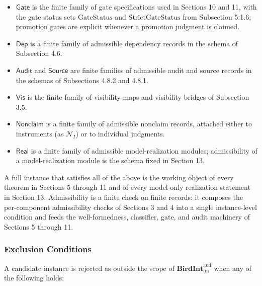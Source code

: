\documentclass[11pt]{article}
\theoremstyle{definition}
\begin{document}
\begin{itemize}
  Threshold records are finite and typed in the threshold schema of Subsection 5.2.
\item
  \(\mathsf{Gate}\) is the finite family of gate specifications used in Sections 10 and 11, with the gate status sets \(\mathrm{GateStatus}\) and \(\mathrm{StrictGateStatus}\) from Subsection 5.1.6; promotion gates are explicit whenever a promotion judgment is claimed.
\item
  \(\mathsf{Dep}\) is a finite family of admissible dependency records in the schema of Subsection 4.6.
\item
  \(\mathsf{Audit}\) and \(\mathsf{Source}\) are finite families of admissible audit and source records in the schemas of Subsections 4.8.2 and 4.8.1.
\item
  \(\mathsf{Vis}\) is the finite family of visibility maps and visibility bridges of Subsection 3.5.
\item
  \(\mathsf{Nonclaim}\) is a finite family of admissible nonclaim records, attached either to instruments (as \(\mathcal N_I\)) or to individual judgments.
\item
  \(\mathsf{Real}\) is a finite family of admissible model-realization modules; admissibility of a model-realization module is the schema fixed in Section 13.
\end{itemize}

A full instance that satisfies all of the above is the working object of every theorem in Sections 5 through 11 and of every model-only realization statement in Section 13. Admissibility is a finite check on finite records: it composes the per-component admissibility checks of Sections 3 and 4 into a single instance-level condition and feeds the well-formedness, classifier, gate, and audit machinery of Sections 5 through 11.

\subsubsection{Exclusion Conditions}

A candidate instance is rejected as outside the scope of \(\mathbf{BirdInt}^{\mathrm{aud}}_{\mathrm{fin}}\) when any of the following holds:
\end{document}
